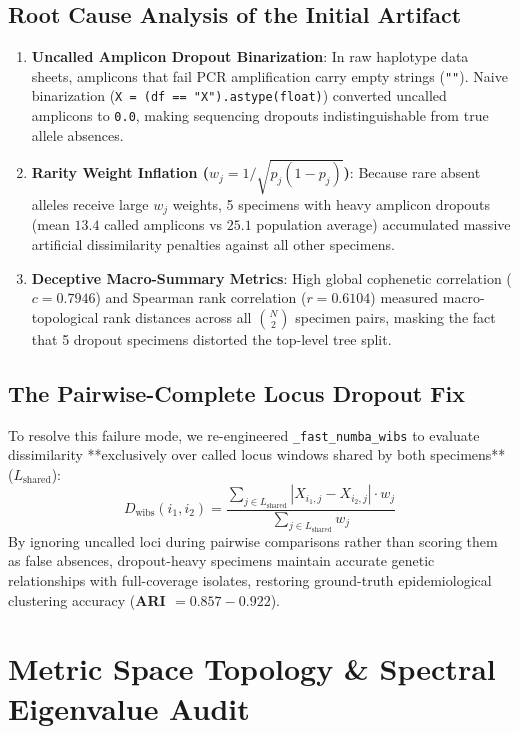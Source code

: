 \documentclass[11pt,a4paper]{article}
\begin{document}
\subsection{Root Cause Analysis of the Initial Artifact}
\begin{enumerate}[leftmargin=*]
    \item \textbf{Uncalled Amplicon Dropout Binarization}: In raw haplotype data sheets, amplicons that fail PCR amplification carry empty strings (\texttt{""}). Naive binarization (\texttt{X = (df == "X").astype(float)}) converted uncalled amplicons to \texttt{0.0}, making sequencing dropouts indistinguishable from true allele absences.
    \item \textbf{Rarity Weight Inflation ($w_j = 1/\sqrt{p_j(1-p_j)}$)}: Because rare absent alleles receive large $w_j$ weights, 5 specimens with heavy amplicon dropouts (mean $13.4$ called amplicons vs $25.1$ population average) accumulated massive artificial dissimilarity penalties against all other specimens.
    \item \textbf{Deceptive Macro-Summary Metrics}: High global cophenetic correlation ($c = 0.7946$) and Spearman rank correlation ($r = 0.6104$) measured macro-topological rank distances across all $\binom{N}{2}$ specimen pairs, masking the fact that 5 dropout specimens distorted the top-level tree split.
\end{enumerate}

\subsection{The Pairwise-Complete Locus Dropout Fix}
To resolve this failure mode, we re-engineered \texttt{\_fast\_numba\_wibs} to evaluate dissimilarity **exclusively over called locus windows shared by both specimens** ($L_{\text{shared}}$):
\begin{equation}
D_{\text{wibs}}(i_1, i_2) = \frac{\sum_{j \in L_{\text{shared}}} |X_{i_1, j} - X_{i_2, j}| \cdot w_j}{\sum_{j \in L_{\text{shared}}} w_j}
\end{equation}
By ignoring uncalled loci during pairwise comparisons rather than scoring them as false absences, dropout-heavy specimens maintain accurate genetic relationships with full-coverage isolates, restoring ground-truth epidemiological clustering accuracy (\textbf{ARI $= 0.857 - 0.922$}).

\section{Metric Space Topology \& Spectral Eigenvalue Audit}
\end{document}
